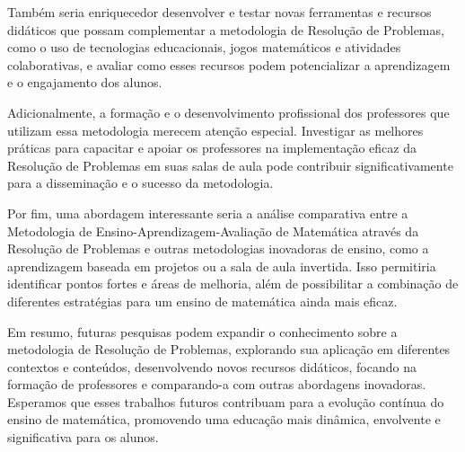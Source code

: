 Também seria enriquecedor desenvolver e testar novas ferramentas e recursos didáticos que possam complementar a metodologia de Resolução de Problemas, como o uso de tecnologias educacionais, jogos matemáticos e atividades colaborativas, e avaliar como esses recursos podem potencializar a aprendizagem e o engajamento dos alunos.

Adicionalmente, a formação e o desenvolvimento profissional dos professores que utilizam essa metodologia merecem atenção especial. Investigar as melhores práticas para capacitar e apoiar os professores na implementação eficaz da Resolução de Problemas em suas salas de aula pode contribuir significativamente para a disseminação e o sucesso da metodologia.

Por fim, uma abordagem interessante seria a análise comparativa entre a Metodologia de Ensino-Aprendizagem-Avaliação de Matemática através da Resolução de Problemas e outras metodologias inovadoras de ensino, como a aprendizagem baseada em projetos ou a sala de aula invertida. Isso permitiria identificar pontos fortes e áreas de melhoria, além de possibilitar a combinação de diferentes estratégias para um ensino de matemática ainda mais eficaz.

Em resumo, futuras pesquisas podem expandir o conhecimento sobre a metodologia de Resolução de Problemas, explorando sua aplicação em diferentes contextos e conteúdos, desenvolvendo novos recursos didáticos, focando na formação de professores e comparando-a com outras abordagens inovadoras. Esperamos que esses trabalhos futuros contribuam para a evolução contínua do ensino de matemática, promovendo uma educação mais dinâmica, envolvente e significativa para os alunos.



\postextual






